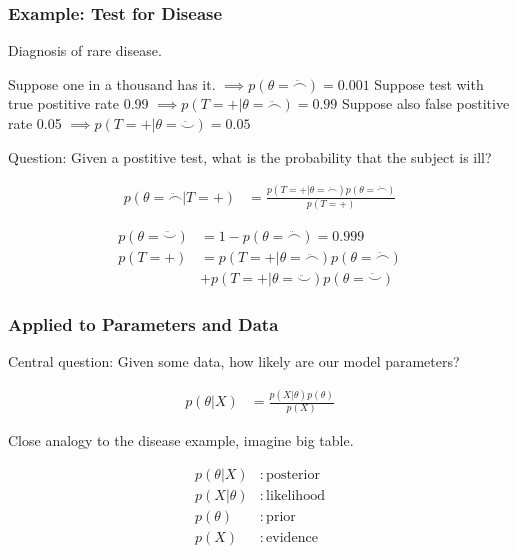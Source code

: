 \documentclass[usenames,dvipsnames,table]{beamer}
\begin{document}
\begin{frame}
\frametitle{Example: Test for Disease}

Diagnosis of rare disease.

Suppose one in a thousand has it. $\implies p(\theta=\ddot\frown) = 0.001$
Suppose test with true postitive rate 0.99 $\implies p(T=+\vert \theta=\ddot\frown) = 0.99$
Suppose also false postitive rate 0.05 $\implies p(T=+\vert \theta=\ddot\smile) = 0.05$

\vspace{1em}
Question: Given a postitive test, what is the probability that the subject is ill?

\begin{align*}
p(\theta=\ddot\frown\vert T=+) &= \frac{p(T=+\vert \theta=\ddot\frown) p(\theta=\ddot\frown)}{p(T=+)}
\end{align*}

\begin{align*}
p(\theta=\ddot\smile) &= 1 - p(\theta=\ddot\frown) = 0.999 \\
p(T=+) &= p(T=+\vert \theta=\ddot\frown)p(\theta=\ddot\frown) \\
         & + p(T=+\vert \theta=\ddot\smile)p(\theta=\ddot\smile)
\end{align*}
\end{frame}




\begin{frame}
\frametitle{Applied to Parameters and Data}
Central question: Given some data, how likely are our model parameters?

\begin{align*}
p(\theta\vert X) &= \frac{p(X\vert \theta) p(\theta)}{p(X)}
\end{align*}

Close analogy to the disease example, imagine big table.

\begin{align*}
p(\theta\vert X)      &: \mathrm{posterior} \\
p(X\vert \theta)      &: \mathrm{likelihood} \\
p(\theta)             &: \mathrm{prior} \\
p(X)                  &: \mathrm{evidence} \\
\end{align*}

\end{frame}
\end{document}
